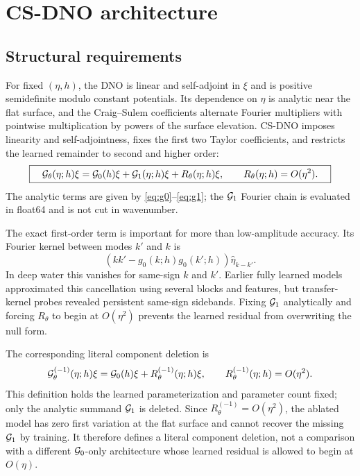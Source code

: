 \section{CS-DNO architecture}
\label{sec:architecture}

\subsection{Structural requirements}

For fixed $(\eta,h)$, the DNO is linear and self-adjoint in $\xi$ and is
positive semidefinite modulo constant potentials.  Its dependence on $\eta$
is analytic near the flat surface, and the Craig--Sulem coefficients alternate
Fourier multipliers with pointwise multiplication by powers of the surface
elevation. CS-DNO
imposes linearity and self-adjointness, fixes the first two Taylor
coefficients, and restricts the learned remainder to second and higher order:
\begin{equation}
  \boxed{\quad
  \mathcal{G}_{\theta}(\eta;h)\xi
  =\mathcal{G}_0(h)\xi+\mathcal{G}_1(\eta;h)\xi+R_\theta(\eta;h)\xi,
  \qquad R_\theta(\eta;h)=O(\eta^2).
  \quad}
  \label{eq:current-model}
\end{equation}
The analytic terms are given by \eqref{eq:g0}--\eqref{eq:g1}; the $\mathcal{G}_1$
Fourier chain is evaluated in float64 and is not cut in wavenumber.

The exact first-order term is important for more than low-amplitude accuracy.
Its Fourier kernel between modes $k'$ and $k$ is
\begin{equation}
  \left(kk'-g_0(k;h)g_0(k';h)\right)\widehat\eta_{k-k'}.
  \label{eq:g1-kernel}
\end{equation}
In deep water this vanishes for same-sign $k$ and $k'$. Earlier fully learned
models approximated this cancellation using several blocks and features, but
transfer-kernel probes revealed persistent same-sign sidebands. Fixing
$\mathcal{G}_1$ analytically and forcing $R_\theta$ to begin at $O(\eta^2)$ prevents
the learned residual from overwriting the null form.

The corresponding literal component deletion is
\begin{equation}
  \mathcal{G}_{\theta}^{(-1)}(\eta;h)\xi
  =\mathcal{G}_0(h)\xi+R_\theta^{(-1)}(\eta;h)\xi,
  \qquad R_\theta^{(-1)}(\eta;h)=O(\eta^2).
  \label{eq:g1-ablation}
\end{equation}
This definition holds the learned parameterization and parameter count fixed;
only the analytic summand $\mathcal{G}_1$ is deleted.  Since
$R_\theta^{(-1)}=O(\eta^2)$, the ablated model has zero first variation at the
flat surface and cannot recover the missing $\mathcal{G}_1$ by training.  It therefore
defines a literal component deletion, not a comparison with a different
$\mathcal{G}_0$-only architecture whose learned residual is allowed to begin at
$O(\eta)$.

